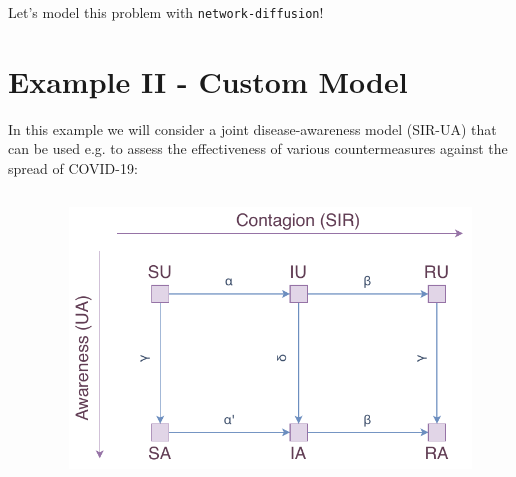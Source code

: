 \documentclass{beamer}
\begin{document}
\begin{frame}{\secname}
    \begin{center}
        \large Let's model this problem with \lstinline[style=py]{network-diffusion}!
    \end{center}
\end{frame}

\section{Example II - Custom Model}

\begin{frame}{\secname}
    In this example we will consider a joint disease-awareness model (SIR-UA) that can be used e.g.
    to assess the effectiveness of various countermeasures against the spread of COVID-19:
    \begin{columns}[T]
        \captionsetup{font=scriptsize}
        \begin{column}{.5\textwidth}
            \begin{table}
            \centering
            \caption{Transition weights with explanation.}
            \end{table}
        \end{column}
        \begin{column}{0.5\textwidth}
        \begin{figure}
            \centering
            \includegraphics[width=\textwidth]{figures/sir_ua.pdf}

\end{figure}
\end{column}
\end{columns}
\end{frame}
\end{document}
